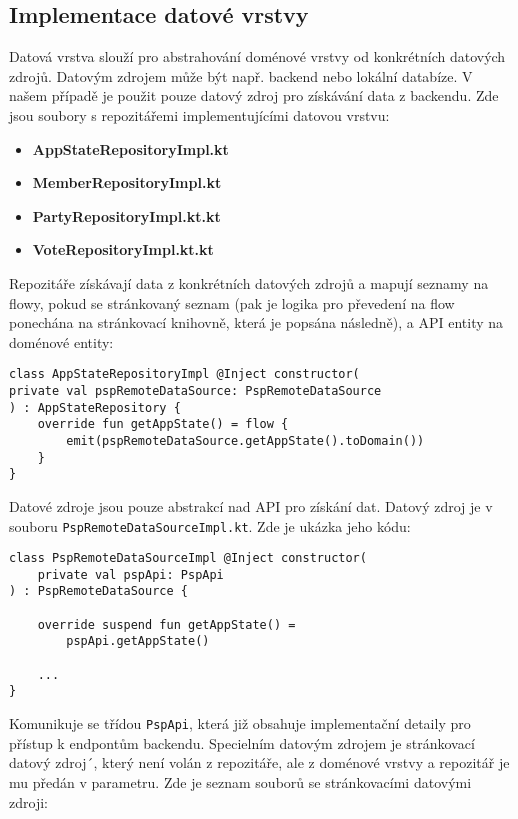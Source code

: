 \subsection {Implementace datové vrstvy}
Datová vrstva slouží pro abstrahování doménové vrstvy od konkrétních datových zdrojů. Datovým zdrojem může být např. backend nebo lokální databíze. V našem případě je použit pouze datový zdroj pro získávání data z backendu. Zde jsou soubory s repozitářemi implementujícími datovou vrstvu:

\begin{itemize}
	\item \textbf{AppStateRepositoryImpl.kt}
	\item \textbf{MemberRepositoryImpl.kt}
	\item \textbf{PartyRepositoryImpl.kt.kt}
	\item \textbf{VoteRepositoryImpl.kt.kt}
\end{itemize}

\noindent Repozitáře získávají data z konkrétních datových zdrojů a mapují seznamy na flowy, pokud se stránkovaný seznam (pak je logika pro převedení na flow ponechána na stránkovací \linebreak knihovně, která je popsána následně), a API entity na doménové entity:

\begin{lstlisting}[caption={Ukázka datové vrstvy pro data o stavu aplikace}, label={lst:use-case-repository}, tabsize=2]
class AppStateRepositoryImpl @Inject constructor(
private val pspRemoteDataSource: PspRemoteDataSource
) : AppStateRepository {
	override fun getAppState() = flow { 			
		emit(pspRemoteDataSource.getAppState().toDomain()) 
	}
}
\end{lstlisting}

\noindent Datové zdroje jsou pouze abstrakcí nad API pro získání dat. Datový zdroj je v souboru \linebreak \lstinline|PspRemoteDataSourceImpl.kt|. Zde je ukázka jeho kódu:

\begin{lstlisting}[caption={Ukázka datového zdroje}, label={lst:data-source}, tabsize=2]
class PspRemoteDataSourceImpl @Inject constructor(
	private val pspApi: PspApi
) : PspRemoteDataSource {
	
	override suspend fun getAppState() = 
		pspApi.getAppState()
		
	...
}
\end{lstlisting}

\noindent Komunikuje se třídou \lstinline|PspApi|, která již obsahuje implementační detaily pro přístup k endpontům backendu. Specielním datovým zdrojem je stránkovací datový zdroj´, který není volán z repozitáře, ale z doménové vrstvy a repozitář je mu předán v parametru. Zde je seznam souborů se stránkovacími datovými zdroji:

